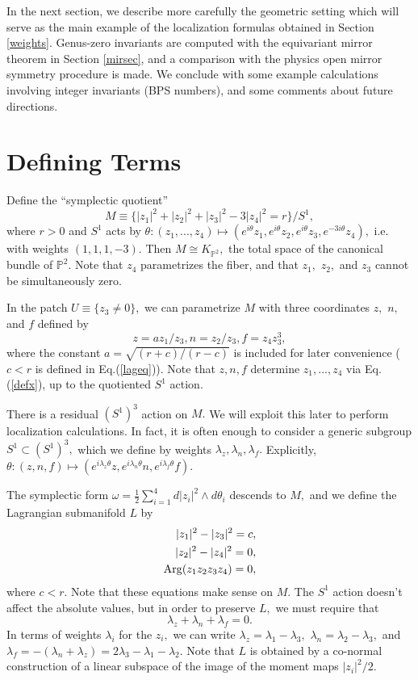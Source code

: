 \documentclass[a4paper,11pt]{article}
\newcommand{\PP}{{\mathbb{P}}}
\begin{document}
\vskip0.2in
In the next section, we describe more carefully the
geometric setting
which will serve
as the main example of the localization
formulas obtained in Section \ref{weights}.
Genus-zero invariants are computed with the equivariant
mirror theorem in Section \ref{mirsec}, and a comparison with
the physics open mirror symmetry procedure is made.
We conclude with some example calculations involving
integer invariants (BPS numbers),
and some comments about future directions.


\section{Defining Terms}
\label{sec:def}
Define the ``symplectic quotient''
\begin{equation}
\label{defx}
M \equiv \lbrace |z_1|^2 + |z_2|^2 + |z_3|^2 - 3|z_4|^2 = r
\rbrace /S^1,
\end{equation}
where $r>0$ and $S^1$ acts by $\theta: (z_1,...,z_4)\mapsto
(e^{i\theta} z_1,e^{i\theta} z_2,e^{i\theta} z_3,
e^{-3i\theta} z_4),$ i.e. with weights $(1,1,1,-3).$
Then $M\cong K_{\PP^2},$ the total space of the canonical
bundle of $\PP^2$.
Note that $z_4$ parametrizes the fiber, and that $z_1,$ $z_2,$
and $z_3$ cannot be simultaneously zero.

In the patch $U \equiv \{z_3 \neq 0\},$ we can parametrize $M$ with three coordinates
$z,$ $n,$ and $f$ defined by
$$z = a z_1/z_3, n = z_2/z_3, f = z_4 z_3^3,$$
where the constant $a = \sqrt{(r+c)/(r-c)}$ is included
for later convenience
($c<r$ is defined in Eq.\!\!\!(\ref{lageq})).
Note that $z,n,f$ determine $z_1, ..., z_4$ via Eq.\!\!\!
(\ref{defx}), up to the quotiented $S^1$ action.

There is a residual $(S^1)^3$ action on $M.$  We will exploit this
later to perform localization calculations.  In fact, it is often
enough to consider a generic subgroup $S^1 \subset (S^1)^3,$
which we define by weights $\lambda_z, \lambda_n, \lambda_f.$
Explicitly, $\theta: (z,n,f) \mapsto (e^{i\lambda_z \theta}z,
e^{i\lambda_n \theta}n,e^{i\lambda_f \theta}f).$

The symplectic form $\omega
= \frac{1}{2} \sum_{i=1}^{4} d|z_i|^2 \wedge d\theta_i$
descends to $M,$  and we define the Lagrangian
submanifold $L$ by
\begin{eqnarray}
\label{lageq}
|z_1|^2 - |z_3|^2 = c, \cr
|z_2|^2 - |z_4|^2 = 0, \cr
{\rm Arg}(z_1 z_2 z_3 z_4) = 0, \cr
\end{eqnarray}
where $c<r.$
Note that these equations make sense on $M.$
The $S^1$ action doesn't affect the absolute values,
but in order to preserve $L,$ we must require
that
\begin{equation}
\label{weightcond}
\lambda_z + \lambda_n + \lambda_f = 0.
\end{equation}
In terms of weights $\lambda_i$ for the $z_i,$
we can write $\lambda_z = \lambda_1 - \lambda_3,$
$\lambda_n = \lambda_2 - \lambda_3,$
and $\lambda_f = - (\lambda_n + \lambda_z) =
2\lambda_3 - \lambda_1 - \lambda_2.$
Note that $L$ is obtained by a co-normal construction
of a linear subspace of the image of the moment
maps $|z_i|^2/2.$
\end{document}
